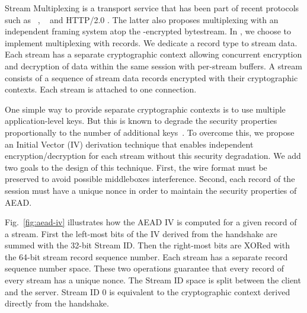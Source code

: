 Stream Multiplexing is a transport service that has been part of recent
protocols such as \sctp~\cite{rfc4960}, \quic~\cite{rfc9000} and HTTP/2.0
\cite{rfc7540}. The latter also proposes multiplexing with an independent
framing system atop the \tls-encrypted \tcp bytestream. In \tcpls, we choose to
implement multiplexing with \tcpls records. We dedicate a \tcpls record type to
\tcpls stream data. Each stream has a separate cryptographic context allowing
concurrent encryption and decryption of data within the same session with
per-stream buffers. A \tcpls stream consists of a sequence of \tcpls stream data records encrypted with their cryptographic contexts. Each stream is attached to one \tcp connection.

One simple way to provide separate cryptographic contexts is to use multiple
application-level keys. But this is known to degrade the security properties
proportionally to the number of additional keys~\cite{chatterjee2011another}. To
overcome this, we propose an Initial Vector (IV) derivation technique that
enables independent encryption/decryption for each stream without this security
degradation. We add two goals to the design of this technique. First, the
 wire format must be preserved to avoid possible middleboxes
interference. Second, each record of the \tcpls session must have a unique
nonce in order to maintain the security properties of AEAD.

Fig.~\ref{fig:aead-iv} illustrates how the AEAD IV is computed for a given
\tcpls record of a \tcpls stream. First the left-most bits of the IV derived
from the \tls handshake are summed with the 32-bit \tcpls Stream ID. Then the
right-most bits are XORed with the  64-bit stream record sequence number. Each
\tcpls stream has a separate record sequence number space.
These two operations guarantee that every record of every \tcpls stream has a
unique nonce.
The Stream ID space is split between the client and the
server. Stream ID 0 is equivalent to the cryptographic context derived directly
from the handshake.

